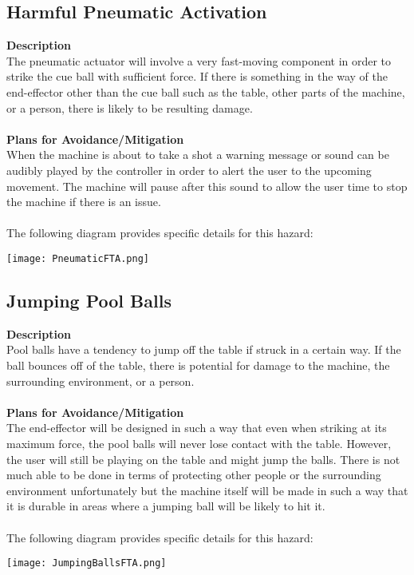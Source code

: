 \documentclass[titlepage]{article}
\begin{document}
\subsection{Harmful Pneumatic Activation}
\textbf{Description}\\
The pneumatic actuator will involve a very fast-moving component in order to strike the cue ball with sufficient force. If there is something in the way of the end-effector other than the cue ball such as the table, other parts of the machine, or a person, there is likely to be resulting damage.\\~\\
\textbf{Plans for Avoidance/Mitigation}\\
When the machine is about to take a shot a warning message or sound can be audibly played by the controller in order to alert the user to the upcoming movement. The machine will pause after this sound to allow the user time to stop the machine if there is an issue.\\~\\
The following diagram provides specific details for this hazard:\\
\begin{center}
	\texttt{[image: PneumaticFTA.png]}
\label{fig:yRailFig}
\end{center}

\newpage
\subsection{Jumping Pool Balls}
\textbf{Description}\\
Pool balls have a tendency to jump off the table if struck in a certain way. If the ball bounces off of the table, there is potential for damage to the machine, the surrounding environment, or a person.\\~\\
\textbf{Plans for Avoidance/Mitigation}\\
The end-effector will be designed in such a way that even when striking at its maximum force, the pool balls will never lose contact with the table. However, the user will still be playing on the table and might jump the balls. There is not much able to be done in terms of protecting other people or the surrounding environment unfortunately but the machine itself will be made in such a way that it is durable in areas where a jumping ball will be likely to hit it.\\~\\
The following diagram provides specific details for this hazard:
\begin{center}
	\texttt{[image: JumpingBallsFTA.png]}
\label{fig:yRailFig}
\end{center}
\end{document}
